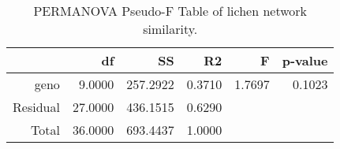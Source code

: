 \begin{table}[ht]
\centering
\begin{tabular}{rrrrrr}
  \hline
 & df & SS & R2 & F & p-value \\ 
  \hline
geno & 9.0000 & 257.2922 & 0.3710 & 1.7697 & 0.1023 \\ 
  Residual & 27.0000 & 436.1515 & 0.6290 &  &  \\ 
  Total & 36.0000 & 693.4437 & 1.0000 &  &  \\ 
   \hline
\end{tabular}
\caption{PERMANOVA Pseudo-F Table of lichen network similarity.} 
\label{tab:cn_perm}
\end{table}
